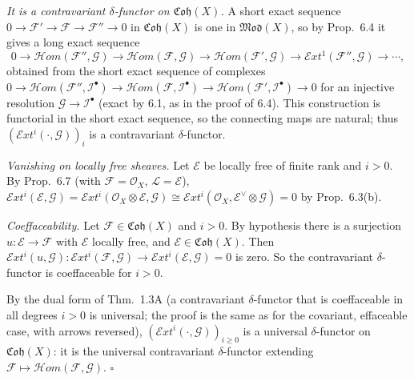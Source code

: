 \documentclass[11pt]{article}
\begin{document}
\emph{It is a contravariant $\delta$-functor on $\mathfrak{Coh}(X)$.} A short exact sequence $0\to\mathcal F'\to\mathcal F\to\mathcal F''\to0$ in $\mathfrak{Coh}(X)$ is one in $\mathfrak{Mod}(X)$, so by Prop.~6.4 it gives a long exact sequence
\[
0\to\mathcal{H}om(\mathcal F'',\mathcal G)\to\mathcal{H}om(\mathcal F,\mathcal G)\to\mathcal{H}om(\mathcal F',\mathcal G)\to\mathcal{E}xt^1(\mathcal F'',\mathcal G)\to\cdots,
\]
obtained from the short exact sequence of complexes $0\to\mathcal{H}om(\mathcal F'',\mathcal I^\bullet)\to\mathcal{H}om(\mathcal F,\mathcal I^\bullet)\to\mathcal{H}om(\mathcal F',\mathcal I^\bullet)\to0$ for an injective resolution $\mathcal G\to\mathcal I^\bullet$ (exact by 6.1, as in the proof of 6.4). This construction is functorial in the short exact sequence, so the connecting maps are natural; thus $(\mathcal{E}xt^i(\cdot,\mathcal G))_i$ is a contravariant $\delta$-functor.

\emph{Vanishing on locally free sheaves.} Let $\mathcal E$ be locally free of finite rank and $i>0$. By Prop.~6.7 (with $\mathcal F=\mathcal O_X$, $\mathcal L=\mathcal E$), $\mathcal{E}xt^i(\mathcal E,\mathcal G)=\mathcal{E}xt^i(\mathcal O_X\otimes\mathcal E,\mathcal G)\cong\mathcal{E}xt^i(\mathcal O_X,\mathcal E^\vee\otimes\mathcal G)=0$ by Prop.~6.3(b).

\emph{Coeffaceability.} Let $\mathcal F\in\mathfrak{Coh}(X)$ and $i>0$. By hypothesis there is a surjection $u\colon\mathcal E\to\mathcal F$ with $\mathcal E$ locally free, and $\mathcal E\in\mathfrak{Coh}(X)$. Then $\mathcal{E}xt^i(u,\mathcal G)\colon\mathcal{E}xt^i(\mathcal F,\mathcal G)\to\mathcal{E}xt^i(\mathcal E,\mathcal G)=0$ is zero. So the contravariant $\delta$-functor is coeffaceable for $i>0$.

By the dual form of Thm.~1.3A (a contravariant $\delta$-functor that is coeffaceable in all degrees $i>0$ is universal; the proof is the same as for the covariant, effaceable case, with arrows reversed), $(\mathcal{E}xt^i(\cdot,\mathcal G))_{i\ge0}$ is a universal $\delta$-functor on $\mathfrak{Coh}(X)$: it is the universal contravariant $\delta$-functor extending $\mathcal F\mapsto\mathcal{H}om(\mathcal F,\mathcal G)$. \hfill$\square$
\end{document}

